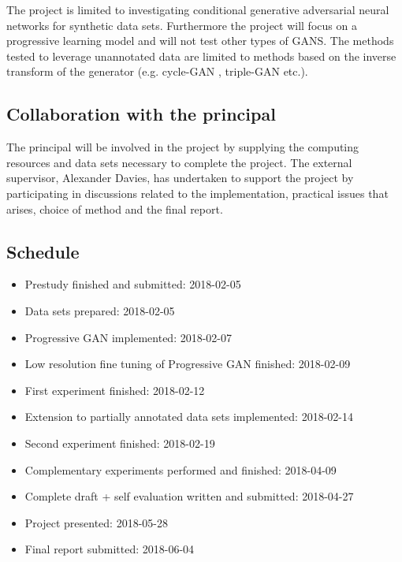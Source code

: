 \documentclass[a4paper]{article}
\begin{document}
The project is limited to investigating conditional generative adversarial neural networks for synthetic data sets. Furthermore the project will focus on a progressive learning model and will not test other types of GANS. The methods tested to leverage unannotated data are limited to methods based on the inverse transform of the generator (e.g. cycle-GAN \cite{zhu2017unpaired}, triple-GAN\cite{li2017triple} etc.). 

\subsection{Collaboration with the principal}
The principal will be involved in the project by supplying the
computing resources and data sets necessary to complete the
project.
The external supervisor, Alexander Davies, has undertaken to support the project by participating in discussions related to the implementation, practical issues that arises, choice of method and the final report.

\subsection{Schedule}
\begin{itemize}
    \item Prestudy finished and submitted: 2018-02-05
    \item Data sets prepared: 2018-02-05
    \item Progressive GAN implemented: 2018-02-07
    \item Low resolution fine tuning of Progressive GAN finished: 2018-02-09
    \item First experiment finished: 2018-02-12 
    \item Extension to partially annotated data sets implemented: 2018-02-14
    \item Second experiment finished: 2018-02-19
    \item Complementary experiments performed and finished: 2018-04-09
    \item Complete draft + self evaluation written and submitted: 2018-04-27
    \item Project presented: 2018-05-28
    \item Final report submitted: 2018-06-04
\end{itemize}



\end{document}

